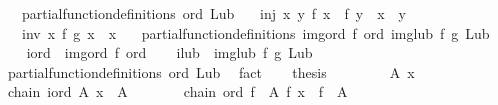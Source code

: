 \begin{isabellebody}
\ \ \ {\isachardoublequoteopen}partial{\isacharunderscore}{\kern0pt}function{\isacharunderscore}{\kern0pt}definitions\ ord\ Lub{\isachardoublequoteclose}\isanewline
\ \ \ inj{\isacharcolon}{\kern0pt}\ {\isachardoublequoteopen}{\isasymAnd}x\ y{\isachardot}{\kern0pt}\ f\ x\ {\isacharequal}{\kern0pt}\ f\ y\ {\isasymLongrightarrow}\ x\ {\isacharequal}{\kern0pt}\ y{\isachardoublequoteclose}\isanewline
\ \ \ inv{\isacharcolon}{\kern0pt}\ {\isachardoublequoteopen}{\isasymAnd}x{\isachardot}{\kern0pt}\ f\ {\isacharparenleft}{\kern0pt}g\ x{\isacharparenright}{\kern0pt}\ {\isacharequal}{\kern0pt}\ x{\isachardoublequoteclose}\isanewline
\ \ \ {\isachardoublequoteopen}partial{\isacharunderscore}{\kern0pt}function{\isacharunderscore}{\kern0pt}definitions\ {\isacharparenleft}{\kern0pt}img{\isacharunderscore}{\kern0pt}ord\ f\ ord{\isacharparenright}{\kern0pt}\ {\isacharparenleft}{\kern0pt}img{\isacharunderscore}{\kern0pt}lub\ f\ g\ Lub{\isacharparenright}{\kern0pt}{\isachardoublequoteclose}\isanewline
%
\isadelimproof
%
\endisadelimproof
%
\isatagproof
{}\isamarkupfalse%
\ {\isacharminus}{\kern0pt}\isanewline
\ \ \isamarkupfalse%
\ {\isacharquery}{\kern0pt}iord\ {\isacharequal}{\kern0pt}\ {\isachardoublequoteopen}img{\isacharunderscore}{\kern0pt}ord\ f\ ord{\isachardoublequoteclose}\isanewline
\ \ \isamarkupfalse%
\ {\isacharquery}{\kern0pt}ilub\ {\isacharequal}{\kern0pt}\ {\isachardoublequoteopen}img{\isacharunderscore}{\kern0pt}lub\ f\ g\ Lub{\isachardoublequoteclose}\isanewline
\isanewline
\ \ \isamarkupfalse%
\ partial{\isacharunderscore}{\kern0pt}function{\isacharunderscore}{\kern0pt}definitions\ ord\ Lub\ \isamarkupfalse%
\ fact\isanewline
\ \ \isamarkupfalse%
\ {\isacharquery}{\kern0pt}thesis\isanewline
\ \ \isamarkupfalse%
\isanewline
\ \ \ \ \isamarkupfalse%
\ A\ x\ \isamarkupfalse%
\ {\isachardoublequoteopen}chain\ {\isacharquery}{\kern0pt}iord\ A{\isachardoublequoteclose}\ {\isachardoublequoteopen}x\ {\isasymin}\ A{\isachardoublequoteclose}\isanewline
\ \ \ \ \isamarkupfalse%
\ \isamarkupfalse%
\ {\isachardoublequoteopen}chain\ ord\ {\isacharparenleft}{\kern0pt}f\ {\isacharbackquote}{\kern0pt}\ A{\isacharparenright}{\kern0pt}{\isachardoublequoteclose}\ {\isachardoublequoteopen}f\ x\ {\isasymin}\ f\ {\isacharbackquote}{\kern0pt}\ A{\isachardoublequoteclose}\isanewline
\ \ \ \ \ \ \isamarkupfalse%

\end{isabellebody}
